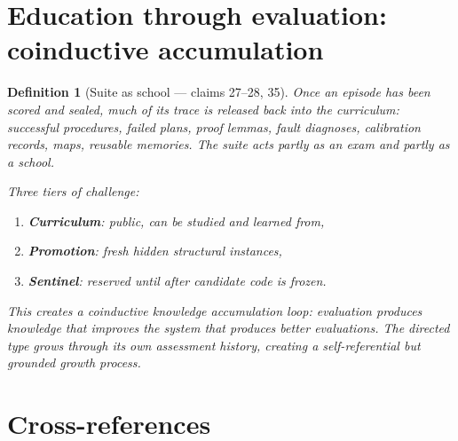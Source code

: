 \documentclass[11pt,a4paper]{article}
\newtheorem{definition}{Definition}[section]
\begin{document}

\section{Education through evaluation: coinductive accumulation}
\label{sec:education}

\begin{definition}[Suite as school --- claims 27--28, 35]
\label{def:school}
Once an episode has been scored and sealed, much of its trace is released
back into the curriculum: successful procedures, failed plans, proof
lemmas, fault diagnoses, calibration records, maps, reusable memories.
The suite acts partly as an exam and partly as a school.

Three tiers of challenge:
\begin{enumerate}
\item \textbf{Curriculum}: public, can be studied and learned from,
\item \textbf{Promotion}: fresh hidden structural instances,
\item \textbf{Sentinel}: reserved until after candidate code is frozen.
\end{enumerate}

This creates a coinductive knowledge accumulation loop: evaluation
produces knowledge that improves the system that produces better
evaluations. The directed type grows through its own assessment history,
creating a self-referential but grounded growth process.
\end{definition}


\section{Cross-references}
\end{document}
